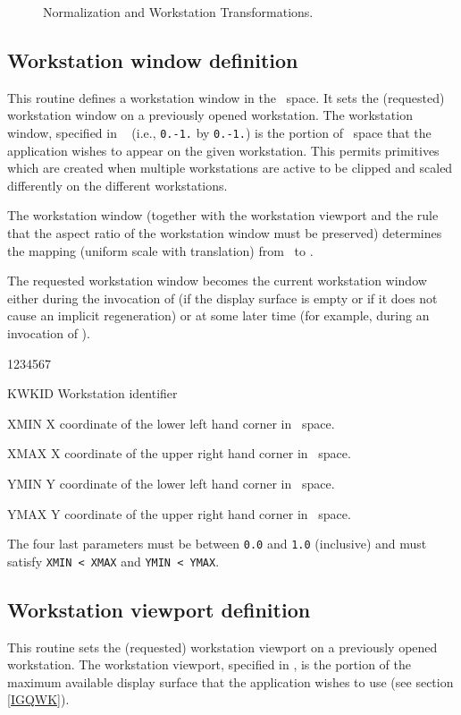 \begin{figure}[p]
\begin{center}\mbox{}\end{center}
\caption{Normalization and Workstation Transformations.}
\label{NTWT}
\end{figure}
\clearpage

\subsection{Workstation window definition}

\Action
This routine defines a workstation window in the \NDC~space.
It sets the (requested) workstation window on a previously opened
workstation. The workstation window, specified in \NDC~
(i.e., {\tt0.-1.} by {\tt0.-1.}) is the portion of \NDC~space that the
application wishes to appear on the given workstation. This permits primitives
which are created when multiple workstations are active to be clipped and scaled
differently on the different workstations.

The workstation window (together with the workstation viewport and the rule that
the aspect ratio of the workstation window must be preserved) determines the
mapping (uniform scale with translation) from \NDC~to \DC.

The requested workstation window becomes the current workstation window either
during the invocation of  (if the display surface is empty or if it
does not cause an implicit regeneration) or at some later time (for example,
during an invocation of ).
\Pdesc
\begin{DLtt}{1234567}
\item[KWKID]Workstation identifier
\item[XMIN] X coordinate of the lower left hand corner in \ndc~space.
\item[XMAX] X coordinate of the upper right hand corner in \ndc~space.
\item[YMIN] Y coordinate of the lower left hand corner in \ndc~space.
\item[YMAX] Y coordinate of the upper right hand corner in \ndc~space.
\end{DLtt}
The four last parameters must be between {\tt0.0} and {\tt1.0}
(inclusive) and must satisfy {\tt XMIN < XMAX} and {\tt YMIN < YMAX}.
%
\subsection{Workstation viewport definition}
\Action
This routine sets the (requested) workstation viewport on a previously opened
workstation. The workstation viewport, specified in \DC, is the
portion of the maximum available display surface that the application wishes to
use (see section \ref{IGQWK}).

